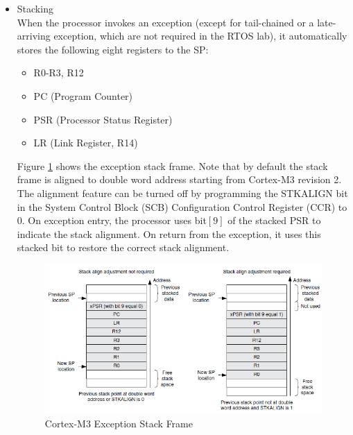 \begin{itemize}
\item{Stacking} \\

When the processor invokes an exception (except for tail-chained or a late-arriving exception, which are not required in the RTOS lab), it automatically stores the following eight registers to the SP:
\begin{itemize}
\item R0-R3, R12
\item PC (Program Counter)
\item PSR (Processor Status Register)
\item LR (Link Register, R14)
\end{itemize}
Figure \ref{fig_cm3_stack_frame} shows the exception stack frame. 
Note that by default the stack frame is aligned to double word 
address starting from Cortex-M3 revision 2.  
The alignment feature can be turned off by programming the 
STKALIGN bit in the System Control Block (SCB) 
Configuration Control Register (CCR) to 0.
On exception entry, the processor uses bit$[9]$ of the stacked PSR
to indicate the stack alignment. On return from the exception, it uses this
stacked bit to restore the correct stack alignment.
\begin{figure}[ht]
\centerline{\includegraphics[width=5in]{figure/CM3_Exception_Stack_Frame}}
\caption[Cortex-M3 Exception Stack Frame] 
        {Cortex-M3 Exception Stack Frame \cite{yiu2009definitive}}
\label{fig_cm3_stack_frame}
\end{figure}


\end{itemize}
